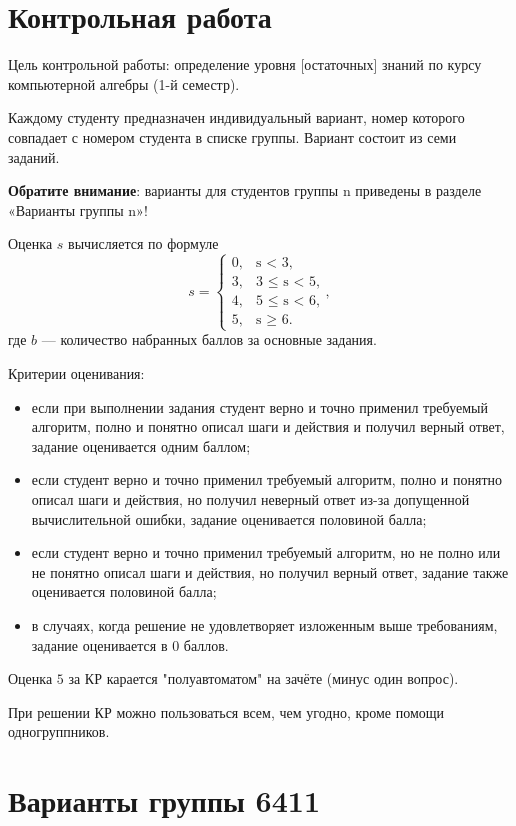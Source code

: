 \documentclass[14pt]{extarticle}
\begin{document}
	\section*{Контрольная работа}
	Цель контрольной работы: определение уровня [остаточных] знаний по курсу компьютерной алгебры (1-й семестр).

	Каждому студенту предназначен индивидуальный вариант, номер которого совпадает с номером студента в списке группы. Вариант состоит из семи заданий.

	\textbf{Обратите внимание}: варианты для студентов группы n приведены в разделе «Варианты группы n»!

	Оценка $s$ вычисляется по формуле
	\[
	s = \begin{cases}
		0,&\textrm{s < 3,}\\
		3,&\textrm{3 $\leq$ s < 5,}\\
		4,&\textrm{5 $\leq$ s < 6,}\\
		5,&\textrm{s $\geq$ 6.}
		\end{cases},
	\]
	где $b$ --- количество набранных баллов за основные задания.

	Критерии оценивания:
	\begin{itemize}
		\item если при выполнении задания студент верно и точно применил требуемый алгоритм, полно и понятно описал шаги и действия и получил верный ответ, задание оценивается одним баллом;
		\item если студент верно и точно применил требуемый алгоритм, полно и понятно описал шаги и действия, но получил неверный ответ из-за допущенной вычислительной ошибки, задание оценивается половиной балла;
		\item если студент верно и точно применил требуемый алгоритм, но не полно или не понятно описал шаги и действия, но получил верный ответ, задание также оценивается половиной балла;
		\item в случаях, когда решение не удовлетворяет изложенным выше требованиям, задание оценивается в 0 баллов.
	\end{itemize}

	Оценка $5$ за КР карается "полуавтоматом" на зачёте (минус один вопрос).

	При решении КР можно пользоваться всем, чем угодно, кроме помощи одногруппников.

	\clearpage

    \tableofcontents 

	\clearpage
	\section{Варианты группы 6411}
\end{document}
